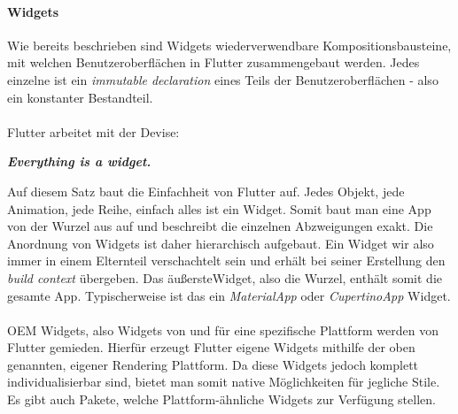 \paragraph{Widgets}
Wie bereits beschrieben sind Widgets wiederverwendbare Kompositionsbausteine, mit welchen Benutzeroberflächen in Flutter zusammengebaut werden. Jedes einzelne ist ein \textit{immutable declaration} eines Teils der Benutzeroberflächen - also ein konstanter Bestandteil.\\
\\
Flutter arbeitet mit der Devise: 
\begin{displayquote}
	\textbf{\textit{Everything is a widget.}}
\end{displayquote}
Auf diesem Satz baut die Einfachheit von Flutter auf. Jedes Objekt, jede Animation, jede Reihe, einfach alles ist ein Widget. Somit baut man eine App von der Wurzel aus auf und beschreibt die einzelnen Abzweigungen exakt.
Die Anordnung von Widgets ist daher hierarchisch aufgebaut. 
Ein Widget wir also immer in einem Elternteil verschachtelt sein und erhält bei seiner Erstellung den \textit{build context} übergeben. Das \glqq äußerste\grqq \space Widget, also die Wurzel, enthält somit die gesamte App. Typischerweise ist das ein \textit{MaterialApp} oder \textit{CupertinoApp} Widget.\\
\\ 
OEM Widgets, also Widgets von und für eine spezifische Plattform werden von Flutter gemieden. Hierfür erzeugt Flutter eigene Widgets mithilfe der oben genannten, eigener Rendering Plattform. Da diese Widgets jedoch komplett individualisierbar sind, bietet man somit native Möglichkeiten für jegliche Stile. Es gibt auch Pakete, welche Plattform-ähnliche Widgets zur Verfügung stellen.

